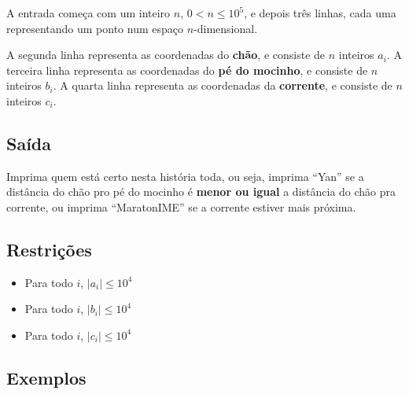 A entrada começa com um inteiro $n$, $0 < n \leq 10^5$, e depois três linhas, cada uma
representando um ponto num espaço $n$-dimensional.

A segunda  linha representa as coordenadas do \textbf{chão}, e consiste de $n$ inteiros $a_i$.
A terceira linha representa as coordenadas do \textbf{pé do mocinho}, e consiste de $n$ inteiros $b_i$.
A quarta   linha representa as coordenadas da \textbf{corrente}, e consiste de $n$ inteiros $c_i$.

\subsection*{Saída}

Imprima quem está certo nesta história toda, ou seja, imprima ``Yan'' se a distância do
chão pro pé do mocinho é \textbf{menor ou igual} a distância do chão pra corrente, ou
imprima ``MaratonIME'' se a corrente estiver mais próxima.


\subsection*{Restrições}
\begin{itemize}
  \item Para todo $i$, $|a_i| \leq 10^4$
  \item Para todo $i$, $|b_i| \leq 10^4$
  \item Para todo $i$, $|c_i| \leq 10^4$
\end{itemize}

\subsection*{Exemplos}

\begin{center}

\end{center}
